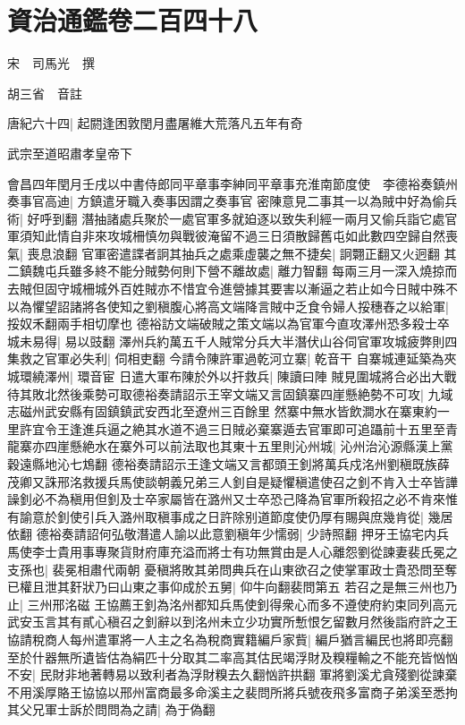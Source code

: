 \section{資治通鑑卷二百四十八}
宋　司馬光　撰

胡三省　音註

唐紀六十四|{
	起閼逢困敦閏月盡屠維大荒落凡五年有奇}


武宗至道昭肅孝皇帝下

會昌四年閏月壬戌以中書侍郎同平章事李紳同平章事充淮南節度使　李德裕奏鎮州奏事官高迪|{
	方鎮遣牙職入奏事因謂之奏事官}
密陳意見二事其一以為賊中好為偷兵術|{
	好呼到翻}
潛抽諸處兵聚於一處官軍多就廹逐以致失利經一兩月又偷兵詣它處官軍須知此情自非來攻城柵慎勿與戰彼淹留不過三日須散歸舊屯如此數四空歸自然喪氣|{
	喪息浪翻}
官軍密遣諜者詗其抽兵之處乘虛襲之無不捷矣|{
	詗翾正翻又火迥翻}
其二鎮魏屯兵雖多終不能分賊勢何則下營不離故處|{
	離力智翻}
每兩三月一深入燒掠而去賊但固守城柵城外百姓賊亦不惜宜令進營據其要害以漸逼之若止如今日賊中殊不以為懼望詔諸將各使知之劉稹腹心將高文端降言賊中乏食令婦人挼穗舂之以給軍|{
	挼奴禾翻兩手相切摩也}
德裕訪文端破賊之策文端以為官軍今直攻澤州恐多殺士卒城未易得|{
	易以豉翻}
澤州兵約萬五千人賊常分兵大半潛伏山谷伺官軍攻城疲弊則四集救之官軍必失利|{
	伺相吏翻}
今請令陳許軍過乾河立寨|{
	乾音干}
自寨城連延築為夾城環繞澤州|{
	環音宦}
日遣大軍布陳於外以扞救兵|{
	陳讀曰陣}
賊見圍城將合必出大戰待其敗北然後乘勢可取德裕奏請詔示王宰文端又言固鎮寨四崖懸絶勢不可攻|{
	九域志磁州武安縣有固鎮鎮武安西北至遼州三百餘里}
然寨中無水皆飲澗水在寨東約一里許宜令王逢進兵逼之絶其水道不過三日賊必棄寨遁去官軍即可追躡前十五里至青龍寨亦四崖懸絶水在寨外可以前法取也其東十五里則沁州城|{
	沁州治沁源縣漢上黨穀遠縣地沁七鴆翻}
德裕奏請詔示王逢文端又言都頭王釗將萬兵戍洺州劉稹既族薛茂卿又誅邢洺救援兵馬使談朝義兄弟三人釗自是疑懼稹遣使召之釗不肯入士卒皆譁譟釗必不為稹用但釗及士卒家屬皆在潞州又士卒恐己降為官軍所殺招之必不肯來惟有諭意於釗使引兵入潞州取稹事成之日許除别道節度使仍厚有賜與庶幾肯從|{
	幾居依翻}
德裕奏請詔何弘敬潛遣人諭以此意劉稹年少懦弱|{
	少詩照翻}
押牙王協宅内兵馬使李士貴用事專聚貨財府庫充溢而將士有功無賞由是人心離怨劉從諫妻裴氏冕之支孫也|{
	裴冕相肅代兩朝}
憂稹將敗其弟問典兵在山東欲召之使掌軍政士貴恐問至奪已權且泄其姧狀乃曰山東之事仰成於五舅|{
	仰牛向翻裴問第五}
若召之是無三州也乃止|{
	三州邢洺磁}
王協薦王釗為洺州都知兵馬使釗得衆心而多不遵使府約束同列高元武安玉言其有貳心稹召之釗辭以到洺州未立少功實所慙恨乞留數月然後詣府許之王協請稅商人每州遣軍將一人主之名為稅商實籍編戶家貲|{
	編戶猶言編民也將即亮翻}
至於什器無所遺皆估為絹匹十分取其二率高其估民竭浮財及糗糧輸之不能充皆忷忷不安|{
	民財非地著轉易以致利者為浮財糗去久翻忷許拱翻}
軍將劉溪尤貪殘劉從諫棄不用溪厚賂王協協以邢州富商最多命溪主之裴問所將兵號夜飛多富商子弟溪至悉拘其父兄軍士訴於問問為之請|{
	為于偽翻}
